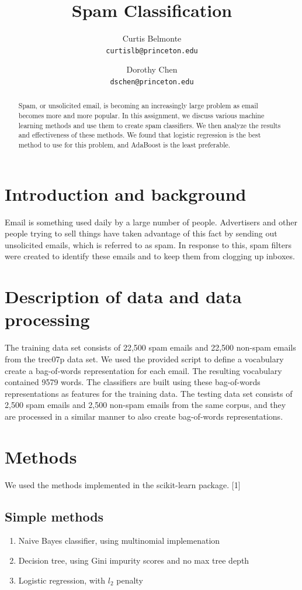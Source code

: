 \documentclass{article} %
\title{Spam Classification}
\author{Curtis Belmonte\\
{\tt\small curtislb@princeton.edu}
\and
Dorothy Chen\\
{\tt\small dschen@princeton.edu}
}
\begin{document}
\maketitle

\begin{abstract}
Spam, or unsolicited email, is becoming an increasingly large problem as email becomes more and more popular. In this assignment, we discuss various machine learning methods and use them to create spam classifiers. We then analyze the results and effectiveness of these methods. We found that logistic regression is the best method to use for this problem, and AdaBoost is the least preferable. 
\end{abstract}

\section{Introduction and background}
Email is something used daily by a large number of people. Advertisers and other people trying to sell things have taken advantage of this fact by sending out unsolicited emails, which is referred to as spam. In response to this, spam filters were created to identify these emails and to keep them from clogging up inboxes.

\section{Description of data and data processing}
The training data set consists of 22,500 spam emails and 22,500 non-spam emails from the trec07p data set. We used the provided script to define a vocabulary create a bag-of-words representation for each email. The resulting vocabulary contained 9579 words. The classifiers are built using these bag-of-words representations as features for the training data. The testing data set consists of 2,500 spam emails and 2,500 non-spam emails from the same corpus, and they are processed in a similar manner to also create bag-of-words representations. 

\section{Methods}
We used the methods implemented in the scikit-learn package. [1]
\subsection{Simple methods}
\begin{enumerate}
  \item Naive Bayes classifier, using multinomial implemenation
  \item Decision tree, using Gini impurity scores and no max tree depth
  \item Logistic regression, with $l_2$ penalty
\end{enumerate}
\end{document}
